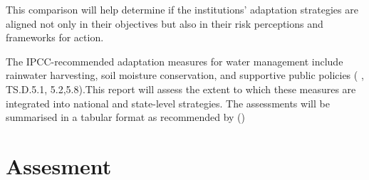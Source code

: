 \documentclass[12pt]{article}
\begin{document}
This comparison will help determine if the institutions' adaptation strategies are aligned not only in their objectives but 
also in their risk perceptions and frameworks for action.

The IPCC-recommended adaptation measures for water management include rainwater harvesting, soil moisture conservation, 
and supportive public policies (\cite{ipcc_technical_summary} , TS.D.5.1, 5.2,5.8).This report will assess the extent to 
which these measures are integrated into national and state-level strategies. The assessments will be summarised in 
a tabular format as recommended by (\cite{craft_2016})



\section*{Assesment}


\pagebreak

\printbibliography
\end{document}
